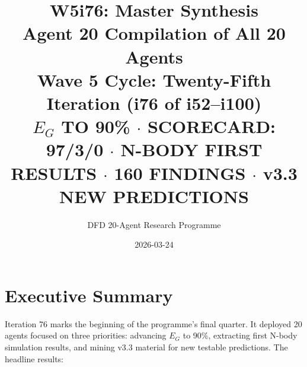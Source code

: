 \documentclass[11pt,a4paper]{article}
\title{\Huge W5i76: Master Synthesis\\[12pt]
\Large Agent 20 Compilation of All 20 Agents\\[6pt]
\large Wave 5 Cycle: Twenty-Fifth Iteration (i76 of i52--i100)\\[6pt]
\normalsize \textbf{$E_G$ TO 90\%} $\cdot$ SCORECARD: 97/3/0 $\cdot$ N-BODY FIRST RESULTS $\cdot$ 160 FINDINGS $\cdot$ v3.3 NEW PREDICTIONS}
\author{DFD 20-Agent Research Programme}
\date{2026-03-24}
\begin{document}
\maketitle

\section{Executive Summary}

Iteration 76 marks the beginning of the programme's final quarter. It deployed 20 agents focused on three priorities: advancing $E_G$ to 90\%, extracting first N-body simulation results, and mining v3.3 material for new testable predictions. The headline results:
\end{document}
